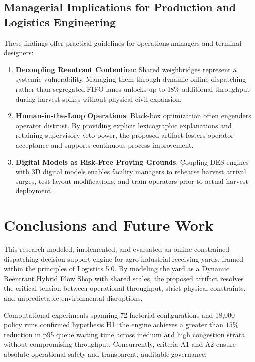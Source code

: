 \documentclass[11pt,a4paper]{article}
\begin{document}
\subsection{Managerial Implications for Production and Logistics Engineering}
These findings offer practical guidelines for operations managers and terminal designers:
\begin{enumerate}[leftmargin=1.2cm,itemsep=0pt,topsep=2pt]
  \item \textbf{Decoupling Reentrant Contention}: Shared weighbridges represent a systemic vulnerability. Managing them through dynamic online dispatching rather than segregated FIFO lanes unlocks up to 18\% additional throughput during harvest spikes without physical civil expansion.
  \item \textbf{Human-in-the-Loop Operations}: Black-box optimization often engenders operator distrust. By providing explicit lexicographic explanations and retaining supervisory veto power, the proposed artifact fosters operator acceptance and supports continuous process improvement.
  \item \textbf{Digital Models as Risk-Free Proving Grounds}: Coupling DES engines with 3D digital models enables facility managers to rehearse harvest arrival surges, test layout modifications, and train operators prior to actual harvest deployment.
\end{enumerate}

\section{Conclusions and Future Work}
\label{sec:conclusion}

This research modeled, implemented, and evaluated an online constrained dispatching decision-support engine for agro-industrial receiving yards, framed within the principles of Logistics 5.0. By modeling the yard as a Dynamic Reentrant Hybrid Flow Shop with shared scales, the proposed artifact resolves the critical tension between operational throughput, strict physical constraints, and unpredictable environmental disruptions.

Computational experiments spanning 72 factorial configurations and 18,000 policy runs confirmed hypothesis H1: the engine achieves a greater than $15\%$ reduction in p95 queue waiting time across medium and high congestion strata without compromising throughput. Concurrently, criteria A1 and A2 ensure absolute operational safety and transparent, auditable governance.
\end{document}
